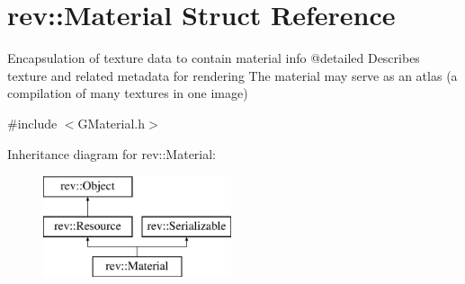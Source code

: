 \hypertarget{classrev_1_1_material}{}\section{rev\+::Material Struct Reference}
\label{classrev_1_1_material}


Encapsulation of texture data to contain material info @detailed Describes texture and related metadata for rendering The material may serve as an atlas (a compilation of many textures in one image)  




{\ttfamily \#include $<$G\+Material.\+h$>$}

Inheritance diagram for rev\+::Material\+:\begin{figure}[H]
\begin{center}
\leavevmode
\includegraphics[height=3.000000cm]{classrev_1_1_material}
\end{center}
\end{figure}
